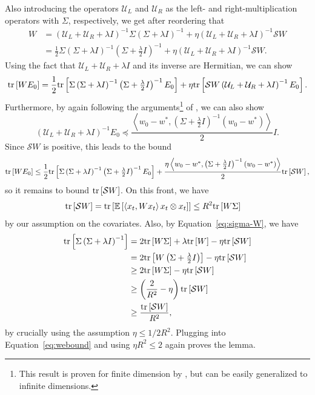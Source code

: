 \documentclass[final,12pt]{colt2018} %
\newcommand{\Sw}{\mathcal{S}}
\newcommand{\UU}{\mathcal{U}}
\newcommand{\trace}[1]{\mbox{\normalfont tr}\left[#1\right]}
\newcommand{\EE}[1]{\mathbb{E}\left[#1\right]}
\newcommand{\pa}[1]{\left(#1\right)}
\newcommand{\iprod}[2]{\left\langle#1, #2\right\rangle}
\begin{document}
Also introducing the operators $\UU_L$ and $\UU_R$ as the left- and right-multiplication operators with $\Sigma$, respectively, we get 
after reordering that
\begin{align*}
 W &= \pa{\UU_L + \UU_R + \lambda I}^{-1} \Sigma \pa{\Sigma + \lambda I}^{-1} + \eta \pa{\UU_L + \UU_R + \lambda I}^{-1} \Sw W
 \\
 &= \frac 12 \Sigma \pa{\Sigma + \lambda I}^{-1} \pa{\Sigma + \textstyle{\frac{\lambda}{2}} I}^{-1} + \eta \pa{\UU_L + \UU_R + \lambda 
I}^{-1} 
\Sw W.
\end{align*}
Using the fact that $\UU_L + \UU_R + \lambda I$ and its inverse are Hermitian, we can show
\begin{align*}
 \trace{WE_0} = \frac 12 \trace{\Sigma \pa{\Sigma + \lambda I}^{-1} \pa{\Sigma + \textstyle{\frac{\lambda}{2}} I}^{-1} E_0} + \eta 
\trace{\Sw W \pa{\UU_L + \UU_R + \lambda I}^{-1}E_0}.
\end{align*}
Furthermore, by again following the arguments\footnote{
This result  is  proven for finite dimension by \citet{DFB16}, but  can be easily generalized to infinite dimensions.}  of 
\citet[pp.~28]{DFB16}, we can also show
\[
 \pa{\UU_L + \UU_R + \lambda I}^{-1}E_0 \preccurlyeq \frac{\iprod{w_0 - w^*}{\pa{\Sigma + \frac{\lambda}{2} I}^{-1} \pa{w_0 - 
w^*}}}{2} I.
\]
Since $\Sw W$ is positive, this leads to the bound
\begin{align}\label{eq:webound}
 \trace{WE_0} \le \frac 12 \trace{\Sigma \pa{\Sigma + \lambda I}^{-1} \pa{\Sigma + \textstyle{\frac{\lambda}{2}} I}^{-1} E_0} + 
\frac{\eta\iprod{w_0 - 
w^*}{\pa{\Sigma + \frac{\lambda}{2} I}^{-1} \pa{w_0 - 
w^*}}}{2} \trace{\Sw W},
\end{align}
so it remains to bound $\trace{\Sw W}$. On this front, we have
\begin{align*}
 \trace{\Sw W} &= \trace{\EE{\iprod{x_t}{W x_t} x_t\otimes x_t}} \le R^2 \trace{W \Sigma}
\end{align*}
by our assumption on the covariates. Also, by Equation~\eqref{eq:sigma-W}, we have
\begin{align*}
 \trace{\Sigma \pa{\Sigma + \lambda I}^{-1}} &= 2 \trace{W\Sigma} + \lambda \trace{W} - \eta \trace{\Sw W}
 \\
 &= 2 \trace{W\pa{\Sigma + \textstyle{\frac{\lambda}{2}} I}} - \eta \trace{\Sw W}
 \\
 &\ge 2 \trace{W \Sigma } - \eta \trace{\Sw W}
 \\
 &\ge \pa{\frac{2}{R^2} - \eta} \trace{\Sw W}
 \\
 &\ge \frac{ \trace{\Sw W}}{R^2},
\end{align*}
by crucially using the assumption $\eta \le 1/2R^2$. Plugging into Equation~\eqref{eq:webound} and using $\eta R^2 \le 2$ again proves the 
lemma.
\jmlrQED
\end{document}
